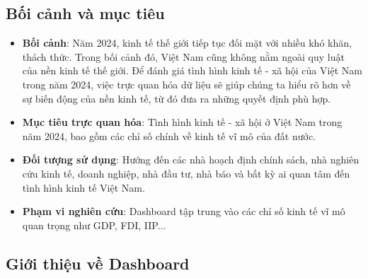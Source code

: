 \documentclass[a4paper]{report}
\begin{document}
\subsection{Bối cảnh và mục tiêu}
{\begin{itemize}
    \item \textbf{Bối cảnh}: Năm 2024, kinh tế thế giới tiếp tục đối mặt với nhiều khó khăn, thách thức. Trong bối cảnh đó, Việt Nam cũng không nằm ngoài quy luật của nền kinh tế thế giới. Để đánh giá tình hình kinh tế - xã hội của Việt Nam trong năm 2024, việc trực quan hóa dữ liệu sẽ giúp chúng ta hiểu rõ hơn về sự biến động của nền kinh tế, từ đó đưa ra những quyết định phù hợp.
    \item \textbf{Mục tiêu trực quan hóa}: Tình hình kinh tế - xã hội ở Việt Nam trong năm 2024, bao gồm các chỉ số chính về kinh tế vĩ mô của đất nước.
    \item \textbf{Đối tượng sử dụng}: Hướng đến các nhà hoạch định chính sách, nhà nghiên cứu kinh tế, doanh nghiệp, nhà đầu tư, nhà báo và bất kỳ ai quan tâm đến tình hình kinh tế Việt Nam.
    \item \textbf{Phạm vi nghiên cứu}: Dashboard tập trung vào các chỉ số kinh tế vĩ mô quan trọng như GDP, FDI, IIP... 
\end{itemize}

\subsection{Giới thiệu về Dashboard}

}
\end{document}
